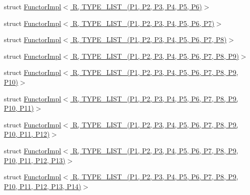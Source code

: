 \begin{DoxyCompactItemize}
\item 
struct \hyperlink{structutilspp_1_1FunctorImpl_3_01R_00_01TYPE__LIST__6_07P1_00_01P2_00_01P3_00_01P4_00_01P5_00_01P6_08_4}{Functor\-Impl$<$ R, T\-Y\-P\-E\-\_\-\-L\-I\-S\-T\-\_(\-P1, P2, P3, P4, P5, P6)$>$}
\item 
struct \hyperlink{structutilspp_1_1FunctorImpl_3_01R_00_01TYPE__LIST__7_07P1_00_01P2_00_01P3_00_01P4_00_01P5_00_01P6_00_01P7_08_4}{Functor\-Impl$<$ R, T\-Y\-P\-E\-\_\-\-L\-I\-S\-T\-\_(\-P1, P2, P3, P4, P5, P6, P7)$>$}
\item 
struct \hyperlink{structutilspp_1_1FunctorImpl_3_01R_00_01TYPE__LIST__8_07P1_00_01P2_00_01P3_00_01P4_00_01P5_00_01P6_00_01P7_00_01P8_08_4}{Functor\-Impl$<$ R, T\-Y\-P\-E\-\_\-\-L\-I\-S\-T\-\_(\-P1, P2, P3, P4, P5, P6, P7, P8)$>$}
\item 
struct \hyperlink{structutilspp_1_1FunctorImpl_3_01R_00_01TYPE__LIST__9_07P1_00_01P2_00_01P3_00_01P4_00_01P5_00_01P6_00_01P7_00_01P8_00_01P9_08_4}{Functor\-Impl$<$ R, T\-Y\-P\-E\-\_\-\-L\-I\-S\-T\-\_(\-P1, P2, P3, P4, P5, P6, P7, P8, P9)$>$}
\item 
struct \hyperlink{structutilspp_1_1FunctorImpl_3_01R_00_01TYPE__LIST__10_07P1_00_01P2_00_01P3_00_01P4_00_01P5_00_0dcb5930806c25abd002b833487c3746a}{Functor\-Impl$<$ R, T\-Y\-P\-E\-\_\-\-L\-I\-S\-T\-\_(\-P1, P2, P3, P4, P5, P6, P7, P8, P9, P10)$>$}
\item 
struct \hyperlink{structutilspp_1_1FunctorImpl_3_01R_00_01TYPE__LIST__11_07P1_00_01P2_00_01P3_00_01P4_00_01P5_00_02390a23e4d9e9c3c4133bb7a8d48a2c0}{Functor\-Impl$<$ R, T\-Y\-P\-E\-\_\-\-L\-I\-S\-T\-\_(\-P1, P2, P3, P4, P5, P6, P7, P8, P9, P10, P11)$>$}
\item 
struct \hyperlink{structutilspp_1_1FunctorImpl_3_01R_00_01TYPE__LIST__12_07P1_00_01P2_00_01P3_00_01P4_00_01P5_00_0f8d0c7f7e384c45bf768264cb987d1dc}{Functor\-Impl$<$ R, T\-Y\-P\-E\-\_\-\-L\-I\-S\-T\-\_(\-P1, P2, P3, P4, P5, P6, P7, P8, P9, P10, P11, P12)$>$}
\item 
struct \hyperlink{structutilspp_1_1FunctorImpl_3_01R_00_01TYPE__LIST__13_07P1_00_01P2_00_01P3_00_01P4_00_01P5_00_0c958a377a1633cfded06d0625afe62c5}{Functor\-Impl$<$ R, T\-Y\-P\-E\-\_\-\-L\-I\-S\-T\-\_(\-P1, P2, P3, P4, P5, P6, P7, P8, P9, P10, P11, P12, P13)$>$}
\item 
struct \hyperlink{structutilspp_1_1FunctorImpl_3_01R_00_01TYPE__LIST__14_07P1_00_01P2_00_01P3_00_01P4_00_01P5_00_068b9945896861b079e861dc8bbcfbe94}{Functor\-Impl$<$ R, T\-Y\-P\-E\-\_\-\-L\-I\-S\-T\-\_(\-P1, P2, P3, P4, P5, P6, P7, P8, P9, P10, P11, P12, P13, P14)$>$}

\end{DoxyCompactItemize}
